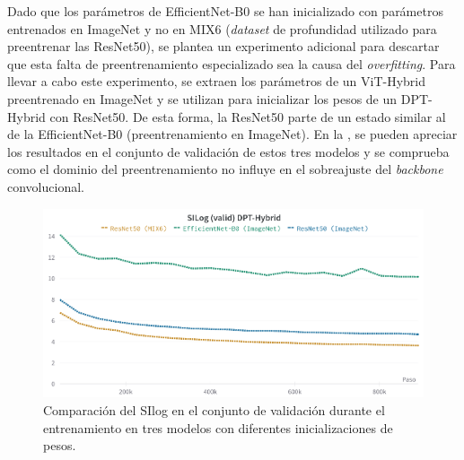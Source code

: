 Dado que los parámetros de EfficientNet-B0 se han inicializado con parámetros entrenados en ImageNet y no en MIX6 (\textit{dataset} de profundidad utilizado para preentrenar las ResNet50), se plantea un experimento adicional para descartar que esta falta de preentrenamiento especializado sea la causa del \textit{overfitting}. Para llevar a cabo este experimento, se extraen los parámetros de un ViT-Hybrid preentrenado en ImageNet y se utilizan para inicializar los pesos de un DPT-Hybrid con ResNet50. De esta forma, la ResNet50 parte de un estado similar al de la EfficientNet-B0 (preentrenamiento en ImageNet). En la , se pueden apreciar los resultados en el conjunto de validación de estos tres modelos y se comprueba como el dominio del preentrenamiento no influye en el sobreajuste del \textit{backbone} convolucional.

\begin{figure}[H]
\centering
\includegraphics[width=\linewidth]{imagenes/Resultados/ResNet50ImageNet.png} 
\captionsetup{width=.95\linewidth}
\caption{Comparación del SIlog en el conjunto de validación durante el entrenamiento en tres modelos con diferentes inicializaciones de pesos.}
\label{fig:mix6-imagenet}
\end{figure}














































